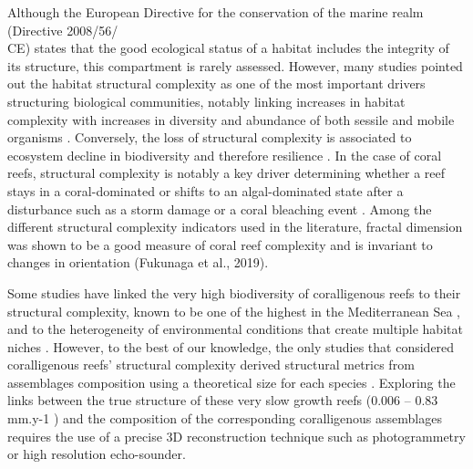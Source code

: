 Although the European Directive for the conservation of the marine realm (Directive 2008/56/\\CE) states that the good ecological status of a habitat includes the integrity of its structure, this compartment is rarely assessed. However, many studies pointed out the habitat structural complexity as one of the most important drivers structuring biological communities, notably linking increases in habitat complexity with increases in diversity and abundance of both sessile and mobile organisms \citep{darling_relationships_2017, graham_importance_2013, gratwicke_relationship_2005, harborne_biotic_2011, kovalenko_habitat_2012, luckhurst_analysis_1978, meager_topographic_2011, rees_abiotic_2014}. Conversely, the loss of structural complexity is associated to ecosystem decline in biodiversity and therefore resilience \citep{ferrari_quantifying_2016}. In the case of coral reefs, structural complexity is notably a key driver determining whether a reef stays in a coral-dominated or shifts to an algal-dominated state after a disturbance such as a storm damage or a coral bleaching event \citep{graham_predicting_2015}. Among the different structural complexity indicators used in the literature, fractal dimension was shown to be a good measure of coral reef complexity and is invariant to changes in orientation (Fukunaga et al., 2019).

Some studies have linked the very high biodiversity of coralligenous reefs to their structural complexity, known to be one of the highest in the Mediterranean Sea \citep{bianchi_biocostruzione_2001}, and to the heterogeneity of environmental conditions that create multiple habitat niches \citep{johnson_area-independent_2003, kipson_rapid_2011, willis_habitat_2005}. However, to the best of our knowledge, the only studies that considered coralligenous reefs’ structural complexity derived structural metrics from assemblages composition using a theoretical size for each species \citep{sartoretto_integrated_2017, valisano_characterization_2019}. Exploring the links between the true structure of these very slow growth reefs (0.006 – 0.83 mm.y-1 \citep{sartoretto_age_1996}) and the composition of the corresponding coralligenous assemblages requires the use of a precise 3D reconstruction technique such as photogrammetry or high resolution echo-sounder.

